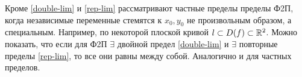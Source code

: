 \documentclass[../../main.tex]{subfiles}
\begin{document}
Кроме \eqref{double-lim} и \eqref{rep-lim} рассматривают частные
пределы пределы Ф2П, когда независимые переменные стемятся к $x_0, y_0$
не произвольным образом, а специальным. Например, по некоторой плоской
кривой $l \subset{D(f)} \subset \mathbb{R}^2$. Можно показать, что если для Ф2П
$\exists$ двойной предел \eqref{double-lim} и $\exists$ повторные
пределы \eqref{rep-lim}, то все они равны между собой. Аналогично и
для частных пределов.
\end{document}
